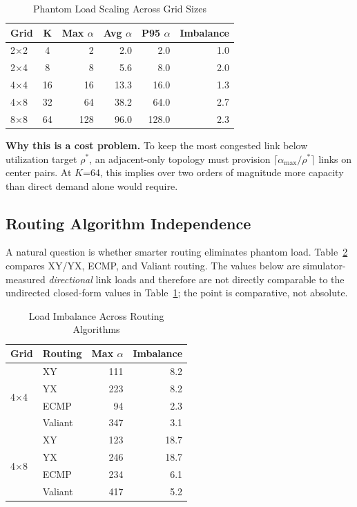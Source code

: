 \documentclass[conference]{IEEEtran}
\begin{document}
\begin{table}[t]
\centering
\caption{Phantom Load Scaling Across Grid Sizes}
\label{tab:scaling}
\footnotesize
\begin{tabular}{lcrrrr}
\toprule
Grid & K & Max $\alpha$ & Avg $\alpha$ & P95 $\alpha$ & Imbalance \\
\midrule
2$\times$2 & 4 & 2 & 2.0 & 2.0 & 1.0 \\
2$\times$4 & 8 & 8 & 5.6 & 8.0 & 2.0 \\
4$\times$4 & 16 & 16 & 13.3 & 16.0 & 1.3 \\
4$\times$8 & 32 & 64 & 38.2 & 64.0 & 2.7 \\
8$\times$8 & 64 & 128 & 96.0 & 128.0 & 2.3 \\
\bottomrule
\end{tabular}
\end{table}

\textbf{Why this is a cost problem.} To keep the most congested link below utilization target $\rho^*$, an adjacent-only topology must provision $\lceil \alpha_{\max} / \rho^* \rceil$ links on center pairs. At $K$=64, this implies over two orders of magnitude more capacity than direct demand alone would require.

\subsection{Routing Algorithm Independence}

A natural question is whether smarter routing eliminates phantom load. Table~\ref{tab:routing} compares XY/YX, ECMP, and Valiant routing. The values below are simulator-measured \textit{directional} link loads and therefore are not directly comparable to the undirected closed-form values in Table~\ref{tab:scaling}; the point is comparative, not absolute.

\begin{table}[t]
\centering
\caption{Load Imbalance Across Routing Algorithms}
\label{tab:routing}
\footnotesize
\begin{tabular}{llrr}
\toprule
Grid & Routing & Max $\alpha$ & Imbalance \\
\midrule
\multirow{4}{*}{4$\times$4} & XY & 111 & 8.2 \\
& YX & 223 & 8.2 \\
& ECMP & 94 & 2.3 \\
& Valiant & 347 & 3.1 \\
\midrule
\multirow{4}{*}{4$\times$8} & XY & 123 & 18.7 \\
& YX & 246 & 18.7 \\
& ECMP & 234 & 6.1 \\
& Valiant & 417 & 5.2 \\
\bottomrule
\end{tabular}
\end{table}
\end{document}
